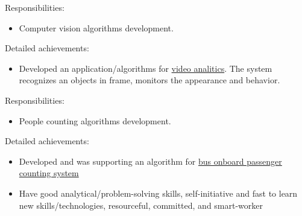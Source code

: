 \documentclass[a4paper,11pt]{memoir}
\begin{document}
{
Responsibilities:
\begin{itemize}
	\item Computer vision algorithms development.
\end{itemize}
Detailed achievements:
\begin{itemize}
	\item Developed an application/algorithms for \href{https://en.videomatrix.ru/vmx-sila/}{video analitics}. The system \mbox{recognizes} an objects in frame, monitors the appearance and behavior.
\end{itemize}
}

{Responsibilities:
\begin{itemize}
	\item People counting algorithms development.
\end{itemize}
Detailed achievements:
\begin{itemize}
	\item Developed and was supporting an algorithm for \href{https://www.youtube.com/watch?v=acb3HhLy3sA}{bus onboard passenger counting system}
\end{itemize}
}

\Sep %

\clearpage %

\userinformation
\framebreak


\begin{itemize}
	\item Have good analytical/problem-solving skills, self-initiative and fast to learn new skills/technologies, resourceful, committed, and smart-worker
\end{itemize}
\Sep



\end{document}
